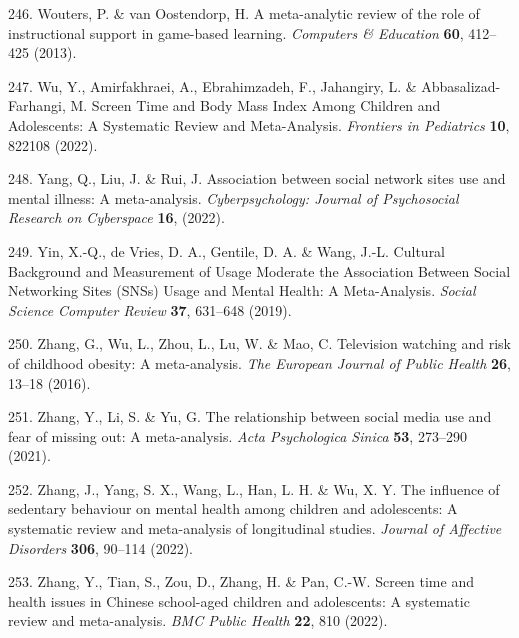 \documentclass[
  english,
  man]{apa6}
\newenvironment{cslreferences}%
  {}%
  {\par}
\begin{document}
\begin{cslreferences}
\leavevmode\hypertarget{ref-woutersMetaanalyticReviewRole2013}{}%
246. Wouters, P. \& van Oostendorp, H. A meta-analytic review of the role of instructional support in game-based learning. \emph{Computers \& Education} \textbf{60}, 412--425 (2013).

\leavevmode\hypertarget{ref-wuScreenTimeBody2022}{}%
247. Wu, Y., Amirfakhraei, A., Ebrahimzadeh, F., Jahangiry, L. \& Abbasalizad-Farhangi, M. Screen Time and Body Mass Index Among Children and Adolescents: A Systematic Review and Meta-Analysis. \emph{Frontiers in Pediatrics} \textbf{10}, 822108 (2022).

\leavevmode\hypertarget{ref-yangAssociationSocialNetwork2022}{}%
248. Yang, Q., Liu, J. \& Rui, J. Association between social network sites use and mental illness: A meta-analysis. \emph{Cyberpsychology: Journal of Psychosocial Research on Cyberspace} \textbf{16}, (2022).

\leavevmode\hypertarget{ref-yinCulturalBackgroundMeasurement2019}{}%
249. Yin, X.-Q., de Vries, D. A., Gentile, D. A. \& Wang, J.-L. Cultural Background and Measurement of Usage Moderate the Association Between Social Networking Sites (SNSs) Usage and Mental Health: A Meta-Analysis. \emph{Social Science Computer Review} \textbf{37}, 631--648 (2019).

\leavevmode\hypertarget{ref-zhangTelevisionWatchingRisk2016}{}%
250. Zhang, G., Wu, L., Zhou, L., Lu, W. \& Mao, C. Television watching and risk of childhood obesity: A meta-analysis. \emph{The European Journal of Public Health} \textbf{26}, 13--18 (2016).

\leavevmode\hypertarget{ref-zhangRelationshipSocialMedia2021}{}%
251. Zhang, Y., Li, S. \& Yu, G. The relationship between social media use and fear of missing out: A meta-analysis. \emph{Acta Psychologica Sinica} \textbf{53}, 273--290 (2021).

\leavevmode\hypertarget{ref-zhangInfluenceSedentaryBehaviour2022}{}%
252. Zhang, J., Yang, S. X., Wang, L., Han, L. H. \& Wu, X. Y. The influence of sedentary behaviour on mental health among children and adolescents: A systematic review and meta-analysis of longitudinal studies. \emph{Journal of Affective Disorders} \textbf{306}, 90--114 (2022).

\leavevmode\hypertarget{ref-zhangScreenTimeHealth2022}{}%
253. Zhang, Y., Tian, S., Zou, D., Zhang, H. \& Pan, C.-W. Screen time and health issues in Chinese school-aged children and adolescents: A systematic review and meta-analysis. \emph{BMC Public Health} \textbf{22}, 810 (2022).


\end{cslreferences}
\end{document}

